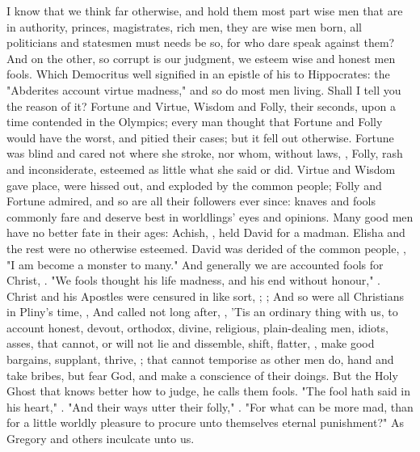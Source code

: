 I know that we think far otherwise, and hold them most part wise men that are
in authority, princes, magistrates, rich men, they are wise
men born, all politicians and statesmen must needs be so, for who dare speak
against them? And on the other, so corrupt is our judgment, we esteem wise and
honest men fools. Which Democritus well signified in an epistle of his to
Hippocrates: the "Abderites account virtue madness," and so
do most men living. Shall I tell you the reason of it?
Fortune and Virtue, Wisdom and Folly, their seconds, upon a
time contended in the Olympics; every man thought that Fortune and Folly would
have the worst, and pitied their cases; but it fell out otherwise. Fortune was
blind and cared not where she stroke, nor whom, without laws, , \etc{} Folly, rash and inconsiderate, esteemed as little what she said
or did. Virtue and Wisdom gave place, were hissed out, and
exploded by the common people; Folly and Fortune admired, and so are all their
followers ever since: knaves and fools commonly fare and deserve best in
worldlings' eyes and opinions. Many good men have no better fate in their ages:
Achish, , held David for a madman.
Elisha and the rest were no otherwise esteemed. David was
derided of the common people, , "I am become a monster
to many." And generally we are accounted fools for Christ, . "We fools thought his life madness, and his end without honour,"
. Christ and his Apostles were censured in like sort,
; ;  And
so were all Christians in Pliny's time, , \etc{} And called not long after,
, \etc{}
'Tis an ordinary thing with us, to account honest, devout, orthodox, divine,
religious, plain-dealing men, idiots, asses, that cannot, or will not lie and
dissemble, shift, flatter, , make
good bargains, supplant, thrive, ; that cannot temporise as other men do, hand and
take bribes, \etc{} but fear God, and make a conscience of their doings. But
the Holy Ghost that knows better how to judge, he calls them fools. "The fool
hath said in his heart," . "And their ways utter
their folly," . "For what can
be more mad, than for a little worldly pleasure to procure unto themselves
eternal punishment?" As Gregory and others inculcate unto us.

